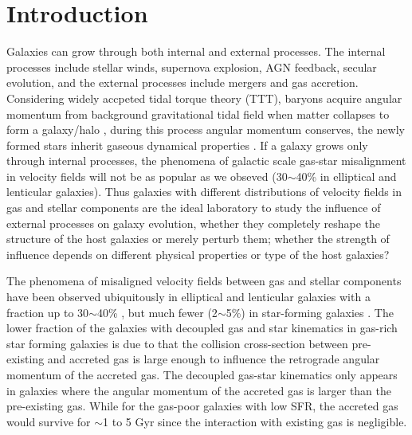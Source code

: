 \section{Introduction}

Galaxies can grow through both internal and external processes. The internal processes include stellar winds, supernova explosion, AGN feedback, secular evolution, and the external processes include mergers and gas accretion. Considering widely accpeted tidal torque theory (TTT), baryons acquire angular momentum from background gravitational tidal field when matter collapses to form a galaxy/halo \citep{1951pca..conf..195H, 1969ApJ...155..393P, 1970Ap......6..320D}, during this process angular momentum conserves, the newly formed stars inherit gaseous dynamical properties \citep{1978MNRAS.183..341W, 1980MNRAS.193..189F, 1998MNRAS.295..319M}. If a galaxy grows only through internal processes, the phenomena of galactic scale gas-star misalignment in velocity fields will not be as popular as we obseved (30$\sim$40\% in elliptical and lenticular galaxies). Thus galaxies with different distributions of velocity fields in gas and stellar components are the ideal laboratory to study the influence of external processes on galaxy evolution, whether they completely reshape the structure of the host galaxies or merely perturb them; whether the strength of influence depends on different physical properties or type of the host galaxies?

The phenomena of misaligned velocity fields between gas and stellar components have been observed ubiquitously in elliptical and lenticular galaxies with a fraction up to 30$\sim$40\% \citep{1992ApJ...401L..79B, 1996MNRAS.283..543K, kannappan_broad_2001, sarzi_sauron_2006, davis_atlas3d_2011, barrera-ballesteros_kinematic_2014, barrera-ballesteros_tracing_2015, chen_growth_2016, jin_sdss-iv_2016}, but much fewer (2$\sim$5\%) in star-forming galaxies \citep{chen_growth_2016, jin_sdss-iv_2016, bryant_sami_2019}. The lower fraction of the galaxies with decoupled gas and star kinematics in gas-rich star forming galaxies is due to that the collision cross-section between pre-existing and accreted gas is large enough to influence the retrograde angular momentum of the accreted gas. The decoupled gas-star kinematics only appears in galaxies where the angular momentum of the accreted gas is larger than the pre-existing gas. While for the gas-poor galaxies with low SFR, the accreted gas would survive for $\sim$1 to 5 Gyr \citep{davis_depletion_2016} since the interaction with existing gas is negligible.

